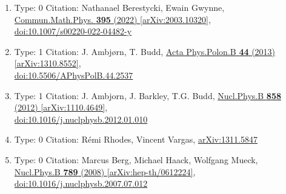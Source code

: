 \documentclass[a4paper,10pt]{article}
\begin{document}
\begin{enumerate}
\begin{enumerate}
  \item Type: 0 Citation: Nathanael Berestycki, Ewain Gwynne, \href{https://www.doi.org/10.1007/s00220-022-04482-y}{Commun.Math.Phys. {\bf 395} (2022) }  \href{https://arxiv.org/abs/2003.10320}{[arXiv:2003.10320]},\\\href{https://www.doi.org/10.1007/s00220-022-04482-y}{doi:10.1007/s00220-022-04482-y}
  \item Type: 1 Citation: J. Ambjørn, T. Budd, \href{https://www.doi.org/10.5506/APhysPolB.44.2537}{Acta Phys.Polon.B {\bf 44} (2013) }  \href{https://arxiv.org/abs/1310.8552}{[arXiv:1310.8552]},\\\href{https://www.doi.org/10.5506/APhysPolB.44.2537}{doi:10.5506/APhysPolB.44.2537}
  \item Type: 1 Citation: J. Ambjorn, J. Barkley, T.G. Budd, \href{https://www.doi.org/10.1016/j.nuclphysb.2012.01.010}{Nucl.Phys.B {\bf 858} (2012) }  \href{https://arxiv.org/abs/1110.4649}{[arXiv:1110.4649]},\\\href{https://www.doi.org/10.1016/j.nuclphysb.2012.01.010}{doi:10.1016/j.nuclphysb.2012.01.010}
  \item Type: 0 Citation: Rémi Rhodes, Vincent Vargas, \href{https://arxiv.org/abs/1311.5847}{arXiv:1311.5847}
  \item Type: 0 Citation: Marcus Berg, Michael Haack, Wolfgang Mueck, \href{https://www.doi.org/10.1016/j.nuclphysb.2007.07.012}{Nucl.Phys.B {\bf 789} (2008) }  \href{https://arxiv.org/abs/hep-th/0612224}{[arXiv:hep-th/0612224]},\\\href{https://www.doi.org/10.1016/j.nuclphysb.2007.07.012}{doi:10.1016/j.nuclphysb.2007.07.012}

\end{enumerate}
\end{enumerate}
\end{document}
